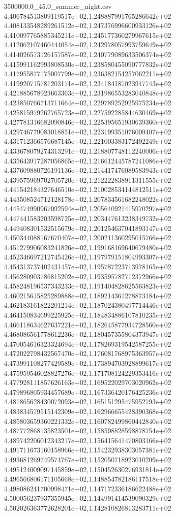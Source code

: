 \begin{filecontents*}{3500000.0_45.0_summer_night.csv}
4.406784513809119517e+02,1.248887991765286642e+02
4.408133548289261512e+02,1.247376996600933126e+02
4.410097765885345211e+02,1.245177360279967615e+02
4.412062107460444054e+02,1.242978057993759649e+02
4.414026573126157587e+02,1.240779089633506374e+02
4.415991162993808530e+02,1.238580455090777832e+02
4.417955877175007799e+02,1.236382154257062211e+02
4.419920715781203171e+02,1.234184187023947743e+02
4.421885678923663363e+02,1.231986553283040848e+02
4.423850766713711664e+02,1.229789252925975234e+02
4.425815979262765723e+02,1.227592285844630169e+02
4.427781316682090846e+02,1.225395651930639360e+02
4.429746779083018851e+02,1.223199351076009407e+02
4.431712366576687145e+02,1.221003383172492249e+02
4.433678079274313291e+02,1.218807748112240006e+02
4.435643917287056865e+02,1.216612445787241086e+02
4.437609880726191136e+02,1.214417476089583943e+02
4.439575969702705720e+02,1.212222838911311555e+02
4.441542184327646510e+02,1.210028534144812511e+02
4.443508524712128178e+02,1.207834561682248022e+02
4.445474990967092594e+02,1.205640921415970297e+02
4.447441583203598725e+02,1.203447613238349732e+02
4.449408301532515679e+02,1.201254637041893147e+02
4.450344088167670407e+02,1.200211360295015766e+02
4.451279906083241826e+02,1.199168169640679480e+02
4.452346697212745426e+02,1.197979151804993307e+02
4.454313737402431457e+02,1.195787223713978165e+02
4.456280903786815202e+02,1.193595782712372966e+02
4.458248196537343233e+02,1.191404828625563823e+02
4.460215615825289888e+02,1.189214361278873184e+02
4.462183161822201214e+02,1.187024380497714446e+02
4.464150834699225925e+02,1.184834886107810235e+02
4.466118634627637221e+02,1.182645877934728560e+02
4.468086561778612236e+02,1.180457355804373947e+02
4.470054616323324694e+02,1.178269319542587255e+02
4.472022798432567470e+02,1.176081768975363957e+02
4.473991108277429589e+02,1.173894703928899617e+02
4.475959546028827276e+02,1.171708124229353416e+02
4.477928111857626163e+02,1.169522029703020962e+02
4.479896805934457689e+02,1.167336420176425236e+02
4.481865628430072093e+02,1.165151295475952793e+02
4.483834579515142309e+02,1.162966655428390368e+02
4.485803659360221332e+02,1.160782499860442840e+02
4.487772868135823501e+02,1.158598828598878754e+02
4.489742206012343217e+02,1.156415641470803166e+02
4.491711673160158966e+02,1.154232938303057381e+02
4.493681269749574767e+02,1.152050718923010209e+02
4.495124009097145859e+02,1.150452630276931814e+02
4.496566806171105668e+02,1.148854782186117518e+02
4.498086241700998471e+02,1.147172336186622488e+02
4.500056237937355945e+02,1.144991414539090329e+02
4.502026363772628201e+02,1.142810826813283711e+02

\end{filecontents*}
